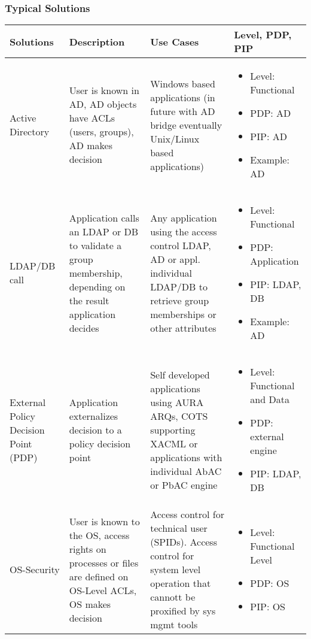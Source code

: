\subsubsection{Typical Solutions}
\begin{table}[h]
    \centering
    \begin{tabular}{p{2cm} | p{4cm} | p{5cm} | p{4cm}}
        \bfseries{Solutions} & \bfseries{Description} & \bfseries{Use Cases} & \bfseries{Level, PDP, PIP}\\ \hline
        Active Directory & User is known in AD, AD objects have ACLs (users, groups), AD makes decision & Windows based applications (in future with AD bridge eventually Unix/Linux based applications) & 
        \begin{itemize}
            \item Level: Functional
            \item PDP: AD
            \item PIP: AD
            \item Example: AD
        \end{itemize}\\
        LDAP/DB call & Application calls an LDAP or DB to validate a group membership, depending on the result application decides & Any application using the access control LDAP, AD or appl. individual LDAP/DB to retrieve group memberships or other attributes &
        \begin{itemize}
            \item Level: Functional
            \item PDP: Application
            \item PIP: LDAP, DB
            \item Example: AD
        \end{itemize}\\
        External Policy Decision Point (PDP) & Application externalizes decision to a policy decision point & Self developed applications using AURA ARQs, COTS supporting XACML or applications with individual AbAC or PbAC engine &
        \begin{itemize}
            \item Level: Functional and Data
            \item PDP: external engine
            \item PIP: LDAP, DB
        \end{itemize}\\
        OS-Security & User is known to the OS, access rights on processes or files are defined on OS-Level ACLs, OS makes decision & Access control for technical user (SPIDs). Access control for system level operation that cannott be proxified by sys mgmt tools &
        \begin{itemize}
            \item Level: Functional Level
            \item PDP: OS
            \item PIP: OS
        \end{itemize}
    \end{tabular}
\end{table}

